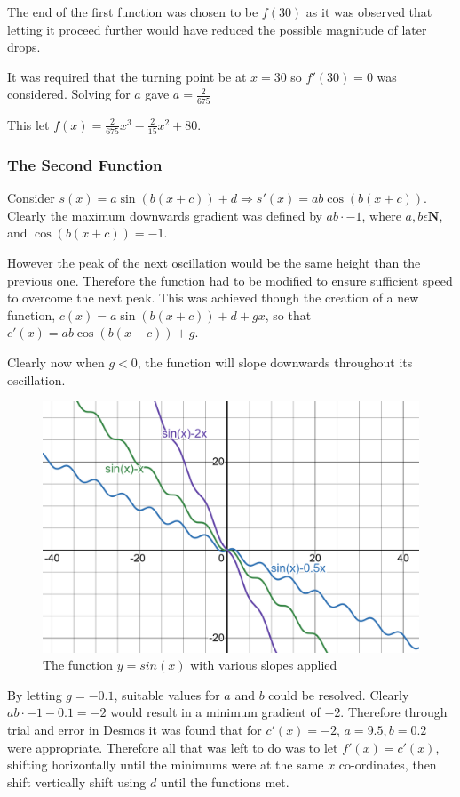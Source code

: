 \documentclass[11pt, letterpaper]{article}
\begin{document}
	


The end of the first function was chosen to be $f(30)$ as it was observed that letting it proceed further would have reduced the possible magnitude of later drops.

It was required that the turning point be at $x=30$ so $f'(30)=0$ was considered. Solving for $a$ gave $a=\frac{2}{675}$

This let $f(x)=\frac{2}{675}x^{3}-\frac{2}{15}x^{2}+80$.


\subsubsection{The Second Function}


Consider $s(x)=a\sin(b(x+c))+d \Rightarrow s'(x)=ab\cos(b(x+c))$. Clearly the maximum downwards gradient was defined by $ab\cdot-1$, where $a,b \epsilon \mathbf{N}$, and $\cos(b(x+c))=-1$.

However the peak of the next oscillation would be the same height than the previous one. Therefore the function  had to be modified to ensure sufficient speed to overcome the next peak. This was achieved though the creation of a new function, $c(x)=a\sin(b(x+c))+d+gx$, so that $c'(x)=ab\cos(b(x+c))+g$.

Clearly now when $g<0$, the function will slope downwards throughout its oscillation. 

	\begin{figure}[h]
		\centering
		\includegraphics[width=15cm]{c(x).png}
		\caption{The function $y=sin(x)$ with various slopes applied}
	\end{figure}
	

By letting $g=-0.1$, suitable values for $a$ and $b$ could be resolved. Clearly $ab\cdot -1-0.1=-2$ would result in a minimum gradient of $-2$. Therefore through trial and error in Desmos it was found that for $c'(x)=-2$, $a=9.5,b=0.2$ were appropriate. Therefore all that was left to do was to let $f'(x)=c'(x)$, shifting horizontally until the minimums were at the same $x$ co-ordinates, then shift vertically shift using $d$ until the functions met.  
\end{document}
